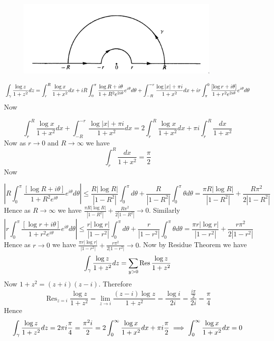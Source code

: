 \documentclass[a4paper, 11pt]{article}
\newcommand{\Res}{\operatorname{Res}}
\begin{document}
{\begin{enumerate}[label=(\alph*)]
\begin{figure}[h]
	\centering
	\includegraphics[width=10cm]{logxint.png}
\end{figure}


\begin{align*}
	\int_{\gamma}\frac{\log z}{1+z^2}dz= \int_r^R \frac{\log x}{1+x^2} d x+i R \int_0^\pi \frac{\log R+i \theta}{1+R^2 e^{2 i \theta}} e^{i \theta} d \theta +\int_{-R}^{-r} \frac{\log |x|+\pi i}{1+x^2} d x+i r \int_\pi^0 \frac{[\log r+i \theta]}{1+r^2 e^{2 i \theta}} e^{i \theta} d \theta
\end{align*}Now

$$\int_{{r}}^R \frac{\log x}{1+x^2} d x+\int_{-R}^{-r} \frac{\log |x|+\pi i}{1+x^2} d x=2 \int_{{r}}^R \frac{\log x}{1+x^2} d x+\pi i \int_{{r}}^R \frac{d x}{1+x^2}$$Now as $r\to 0$ and $R\to \infty$ we have $$\int_{{r}}^R \frac{d x}{1+x^2}=\frac{\pi}{2}$$ Now

$$
	\left|R \int_0^\pi \frac{[\log R+i \theta]}{1+R^2 e^{i \theta}} e^{i \theta} d \theta\right|  \leq \frac{R|\log R|}{\left|1-R^2\right|} \int_0^\pi d \theta+\frac{R}{\left|1-R^2\right|} \int_0^\pi \theta d \theta  =\frac{\pi R|\log R|}{\left|1-R^2\right|}+\frac{R \pi^2}{2\left|1-R^2\right|} 
$$
Hence as $R\to \infty$ we have $\frac{\pi R|\log R|}{\left|1-R^2\right|}+\frac{R \pi^2}{2\left|1-R^2\right|} \to 0$. Similarly $$	\left|r \int_0^\pi \frac{[\log r+i \theta]}{1+r^2 e^{i \theta}} e^{i \theta} d \theta\right|  \leq \frac{r|\log r|}{\left|1-r^2\right|} \int_0^\pi d \theta+\frac{r}{\left|1-r^2\right|} \int_0^\pi \theta d \theta  =\frac{\pi r|\log r|}{\left|1-r^2\right|}+\frac{r \pi^2}{2\left|1-r^2\right|} $$Hence as $r\to 0$ we have $\frac{\pi r|\log r|}{\left|1-r^2\right|}+\frac{r \pi^2}{2\left|1-r^2\right|}\to 0$. Now by Residue Theorem we have $$	\int_{\gm}\frac{\log z}{1+z^2}dz=\sum_{y>0} \Res \frac{\log z}{1+z^2}$$ Now $1+z^2=(z+i)(z-i)$. Therefore $$\Res_{z=i}\frac{\log z}{1+z^2}=\lim\limits_{z\to i}\frac{(z-i)\log z}{1+z^2}=\frac{\log i}{2i}=\frac{\frac{i\pi}{2}}{2i}=\frac{\pi}{4}$$Hence $$\int_{\gamma}\frac{\log z}{1+z^2}dz=2\pi i\frac{\pi}{4}=\frac{\pi^2i}{2}=2\int_0^{\infty}\frac{\log x}{1+x^2}dx+\pi i\frac{\pi}2\implies \int_0^{\infty}\frac{\log x}{1+x^2}dx=0$$



\end{enumerate}}
\end{document}
